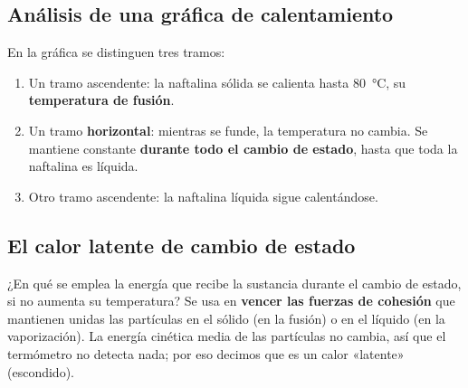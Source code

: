 \subsection{Análisis de una gráfica de calentamiento}

\begin{center}
\end{center}

En la gráfica se distinguen tres tramos:
\begin{enumerate}[label=\numberballblue]
    \item Un tramo ascendente: la naftalina sólida se calienta hasta \qty{80}{\degreeCelsius}, su \textbf{temperatura de fusión}.
    \item Un tramo \textbf{horizontal}: mientras se funde, la temperatura no cambia. Se mantiene constante \textbf{durante todo el cambio de estado}, hasta que toda la naftalina es líquida.
    \item Otro tramo ascendente: la naftalina líquida sigue calentándose.
\end{enumerate}

\subsection{El calor latente de cambio de estado}

¿En qué se emplea la energía que recibe la sustancia durante el cambio de estado, si no aumenta su temperatura? Se usa en \textbf{vencer las fuerzas de cohesión} que mantienen unidas las partículas en el sólido (en la fusión) o en el líquido (en la vaporización). La energía cinética media de las partículas no cambia, así que el termómetro no detecta nada; por eso decimos que es un calor «latente» (escondido).

